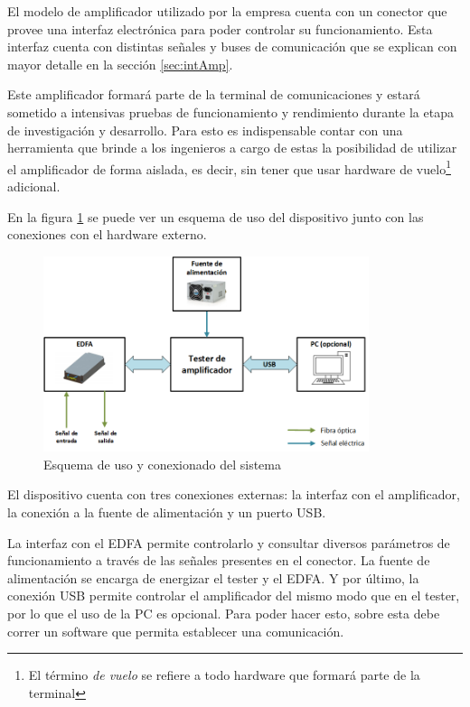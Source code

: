 El modelo de amplificador utilizado por la empresa cuenta con un conector que provee una interfaz electrónica para poder controlar su funcionamiento. Esta interfaz cuenta con distintas señales y buses de comunicación que se explican con mayor detalle en la sección \ref{sec:intAmp}.

Este amplificador formará parte de la terminal de comunicaciones y estará sometido a intensivas pruebas de funcionamiento y rendimiento durante la etapa de investigación y desarrollo. Para esto es indispensable contar con una herramienta que brinde a los ingenieros a cargo de estas la posibilidad de utilizar el amplificador de forma aislada, es decir, sin tener que usar hardware de vuelo\footnote{El término \textit{de vuelo} se refiere a todo hardware que formará parte de la terminal} adicional.

En la figura \ref{fig:bloquesProy} se puede ver un esquema de uso del dispositivo junto con las conexiones con el hardware externo.

\begin{figure}[H]
\centering
\includegraphics[width=0.85\textwidth]{./Figures/bloquesProy.png}
\caption{Esquema de uso y conexionado del sistema}
\label{fig:bloquesProy}
\end{figure}

El dispositivo cuenta con tres conexiones externas: la interfaz con el amplificador, la conexión a la fuente de alimentación y un puerto USB.

La interfaz con el EDFA permite controlarlo y consultar diversos parámetros de funcionamiento a través de las señales presentes en el conector. La fuente de alimentación se encarga de energizar el tester y el EDFA. Y por último, la conexión USB permite controlar el amplificador del mismo modo que en el tester, por lo que el uso de la PC es opcional. Para poder hacer esto, sobre esta debe correr un software que permita establecer una comunicación.

